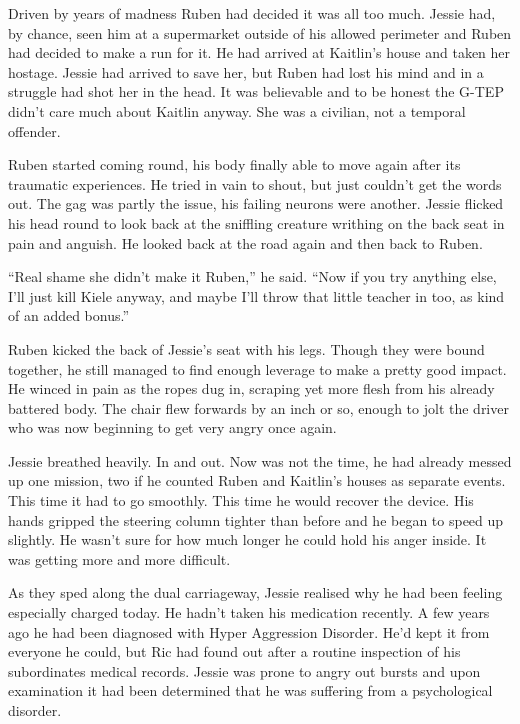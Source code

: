 Driven by years of madness Ruben had decided it was all too much.  Jessie had, by chance, seen him at a supermarket outside of his allowed perimeter and Ruben had decided to make a run for it.  He had arrived at Kaitlin's house and taken her hostage.  Jessie had arrived to save her, but Ruben had lost his mind and in a struggle had shot her in the head.  It was believable and to be honest the G-TEP didn't care much about Kaitlin anyway.  She was a civilian, not a temporal offender.

Ruben started coming round, his body finally able to move again after its traumatic experiences.  He tried in vain to shout, but just couldn't get the words out.  The gag was partly the issue, his failing neurons were another.  Jessie flicked his head round to look back at the sniffling creature writhing on the back seat in pain and anguish.  He looked back at the road again and then back to Ruben.  

``Real shame she didn't make it Ruben,'' he said.  ``Now if you try anything else, I'll just kill Kiele anyway, and maybe I'll throw that little teacher in too, as kind of an added bonus.''

Ruben kicked the back of Jessie's seat with his legs.  Though they were bound together, he still managed to find enough leverage to make a pretty good impact.  He winced in pain as the ropes dug in, scraping yet more flesh from his already battered body.  The chair flew forwards by an inch or so, enough to jolt the driver who was now beginning to get very angry once again.

Jessie breathed heavily.  In and out.  Now was not the time, he had already messed up one mission, two if he counted Ruben and Kaitlin's houses as separate events.  This time it had to go smoothly.  This time he would recover the device.  His hands gripped the steering column tighter than before and he began to speed up slightly.  He wasn't sure for how much longer he could hold his anger inside.  It was getting more and more difficult.

As they sped along the dual carriageway, Jessie realised why he had been feeling especially charged today.  He hadn't taken his medication recently.  A few years ago he had been diagnosed with Hyper Aggression Disorder.  He'd kept it from everyone he could, but Ric had found out after a routine inspection of his subordinates medical records.  Jessie was prone to angry out bursts and upon examination it had been determined that he was suffering from a psychological disorder.

